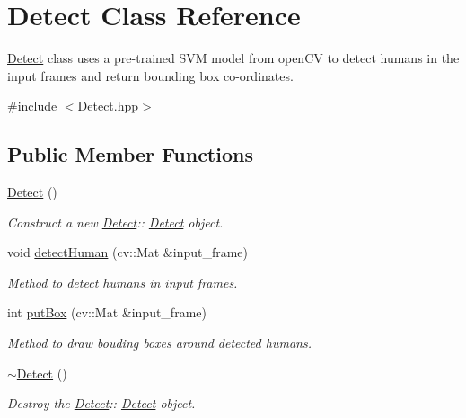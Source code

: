 \hypertarget{classDetect}{}\section{Detect Class Reference}
\label{classDetect}


\hyperlink{classDetect}{Detect} class uses a pre-\/trained S\+VM model from open\+CV to detect humans in the input frames and return bounding box co-\/ordinates.  




{\ttfamily \#include $<$Detect.\+hpp$>$}

\subsection*{Public Member Functions}
\begin{DoxyCompactItemize}
\item 
\mbox{\label{classDetect_afefa427dddf8e308f93fd49424cc3680}} 
\hyperlink{classDetect_afefa427dddf8e308f93fd49424cc3680}{Detect} ()
\begin{DoxyCompactList}\small\item\em Construct a new \hyperlink{classDetect}{Detect}\+:\+: \hyperlink{classDetect}{Detect} object. \end{DoxyCompactList}\item 
void \hyperlink{classDetect_a178c6c5220c2726f0adc6aa464dff543}{detect\+Human} (cv\+::\+Mat \&input\+\_\+frame)
\begin{DoxyCompactList}\small\item\em Method to detect humans in input frames. \end{DoxyCompactList}\item 
int \hyperlink{classDetect_a46940b188132ade41fede81831144f00}{put\+Box} (cv\+::\+Mat \&input\+\_\+frame)
\begin{DoxyCompactList}\small\item\em Method to draw bouding boxes around detected humans. \end{DoxyCompactList}\item 
\mbox{\label{classDetect_aa808b1146b9b8db316b25b02f0a6b5f3}} 
\hyperlink{classDetect_aa808b1146b9b8db316b25b02f0a6b5f3}{$\sim$\+Detect} ()
\begin{DoxyCompactList}\small\item\em Destroy the \hyperlink{classDetect}{Detect}\+:\+: \hyperlink{classDetect}{Detect} object. \end{DoxyCompactList}\end{DoxyCompactItemize}
